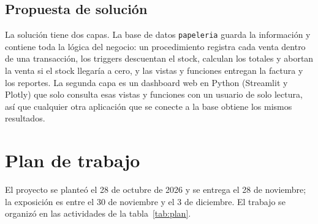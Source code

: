 \documentclass[12pt,a4paper]{article}
\newcommand{\cod}[1]{{\ttfamily\nolinkurl{#1}}}
\begin{document}
\subsection{Propuesta de solución}

La solución tiene dos capas. La base de datos \cod{papeleria} guarda la
información y contiene toda la lógica del negocio: un procedimiento registra
cada venta dentro de una transacción, los triggers descuentan el stock, calculan
los totales y abortan la venta si el stock llegaría a cero, y las vistas y
funciones entregan la factura y los reportes. La segunda capa es un dashboard
web en Python (Streamlit y Plotly) que solo consulta esas vistas y funciones con
un usuario de solo lectura, así que cualquier otra aplicación que se conecte a la
base obtiene los mismos resultados.

\section{Plan de trabajo}

El proyecto se planteó el 28 de octubre de 2026 y se entrega el 28 de noviembre;
la exposición es entre el 30 de noviembre y el 3 de diciembre. El trabajo se
organizó en las actividades de la tabla~\ref{tab:plan}.
\end{document}
